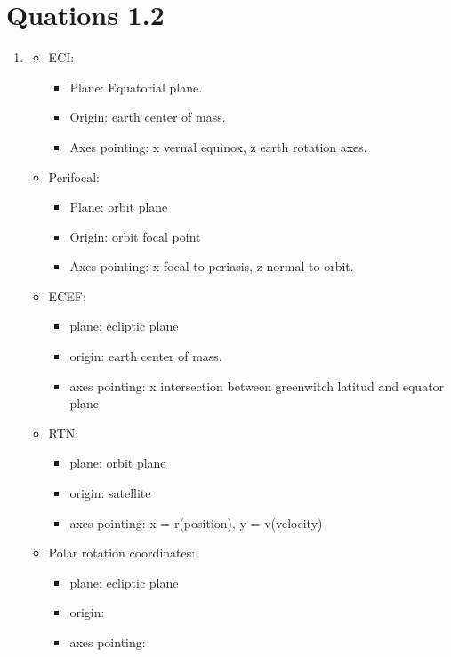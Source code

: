 \documentclass[a4paper]{article}
\begin{document}
\section{Quations 1.2}
\begin{enumerate}[label=\emph{\alph*)}]
  \item %
    \begin{itemize}[label=\textbullet]
      \item ECI:
	\begin{itemize}
	  \item Plane: Equatorial plane.
	  \item Origin: earth center of mass.
	  \item Axes pointing: x vernal equinox, z earth rotation axes.
	\end{itemize}
      \item Perifocal:
	\begin{itemize}
	  \item Plane: orbit plane
	  \item Origin: orbit focal point
	  \item Axes pointing: x focal to periasis, z normal to orbit.
	\end{itemize}
      \item ECEF:
	\begin{itemize}
	  \item plane: ecliptic plane 
	  \item origin: earth center of mass.
	  \item axes pointing: x intersection between greenwitch latitud  and equator plane
	\end{itemize}
      \item RTN:
	\begin{itemize}
	  \item plane: orbit plane
	  \item origin: satellite
	  \item axes pointing: x = r(position), y = v(velocity)
	\end{itemize}
      \item Polar rotation coordinates:
	\begin{itemize}
	  \item plane: ecliptic plane
	  \item origin:
	  \item axes pointing:
	\end{itemize}
    \end{itemize}


\end{enumerate}
\end{document}
